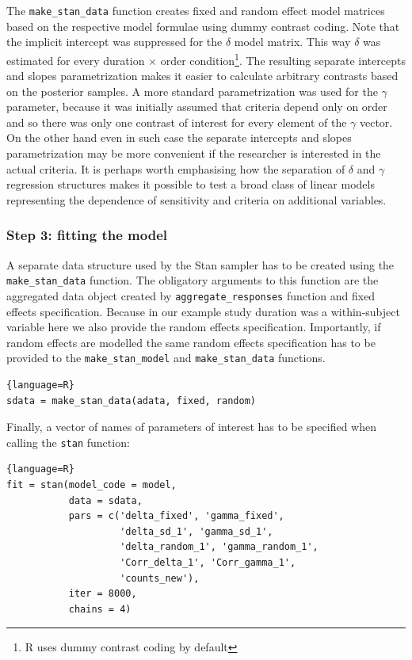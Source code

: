 \documentclass[oneside,a4paper]{article}
\begin{document}
The \texttt{make\_stan\_data} function creates fixed and random effect
model matrices based on the respective model formulae using dummy
contrast coding. Note that the implicit intercept was suppressed for
the $\delta$ model matrix. This way $\delta$ was estimated for every
duration $\times$ order condition\footnote{R uses dummy contrast
  coding by default}. The resulting separate intercepts and slopes
parametrization makes it easier to calculate arbitrary contrasts based
on the posterior samples. A more standard parametrization was used for
the $\gamma$ parameter, because it was initially assumed that criteria
depend only on order and so there was only one contrast of interest
for every element of the $\gamma$ vector. On the other hand even in
such case the separate intercepts and slopes parametrization may be
more convenient if the researcher is interested in the actual
criteria. It is perhaps worth emphasising how the separation of
$\delta$ and $\gamma$ regression structures makes it possible to test
a broad class of linear models representing the dependence of
sensitivity and criteria on additional variables.

\subsubsection{Step 3: fitting the model}

A separate data structure used by the Stan sampler has to be created
using the \texttt{make\_stan\_data} function. The obligatory arguments
to this function are the aggregated data object created by
\texttt{aggregate\_responses} function and fixed effects
specification. Because in our example study duration was a
within-subject variable here we also provide the random effects
specification. Importantly, if random effects are modelled the same
random effects specification has to be provided to the
\texttt{make\_stan\_model} and \texttt{make\_stan\_data} functions.

\begin{lstlisting}{language=R}
sdata = make_stan_data(adata, fixed, random)
\end{lstlisting}

Finally, a vector of names of parameters of interest has to be
specified when calling the \texttt{stan} function:

\begin{lstlisting}{language=R}
fit = stan(model_code = model,
           data = sdata,
           pars = c('delta_fixed', 'gamma_fixed',
                    'delta_sd_1', 'gamma_sd_1',
                    'delta_random_1', 'gamma_random_1',
                    'Corr_delta_1', 'Corr_gamma_1',
                    'counts_new'),
           iter = 8000,
           chains = 4)
\end{lstlisting}
\end{document}
